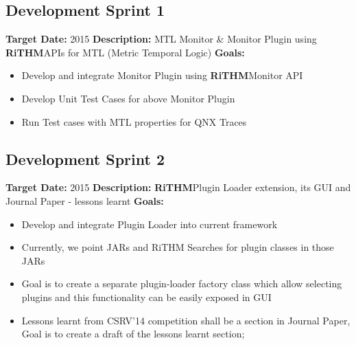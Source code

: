 \documentclass[]{article}
\newcommand{\rithm}{\textbf{RiTHM}\space}
\begin{document}
\subsection{Development Sprint 1}
\textbf{Target Date:}\space {} {2015}\newline
\textbf{Description:} MTL Monitor \& Monitor Plugin using \rithm APIs for MTL (Metric Temporal Logic)\newline
\textbf{Goals:}
\begin{itemize}
\item Develop and integrate Monitor Plugin using \rithm Monitor API
\item Develop Unit Test Cases for above Monitor Plugin
\item Run Test cases with MTL properties for QNX Traces\\
\end{itemize}

\subsection{Development Sprint 2}
\textbf{Target Date:}\space {} {2015}\newline
\textbf{Description:} \rithm Plugin Loader extension,  its GUI and Journal Paper - lessons learnt\newline
\textbf{Goals:}
\begin{itemize}
\item
Develop and integrate Plugin Loader into current framework
\item
Currently, we point JARs and RiTHM Searches for plugin classes in those JARs
\item
Goal is to create a separate plugin-loader factory class which allow selecting plugins and this functionality can be
easily exposed in GUI
\item
Lessons learnt from CSRV'14 competition shall be a section in Journal Paper, Goal is to create a draft of the lessons learnt section; 

\end{itemize}
\end{document}
